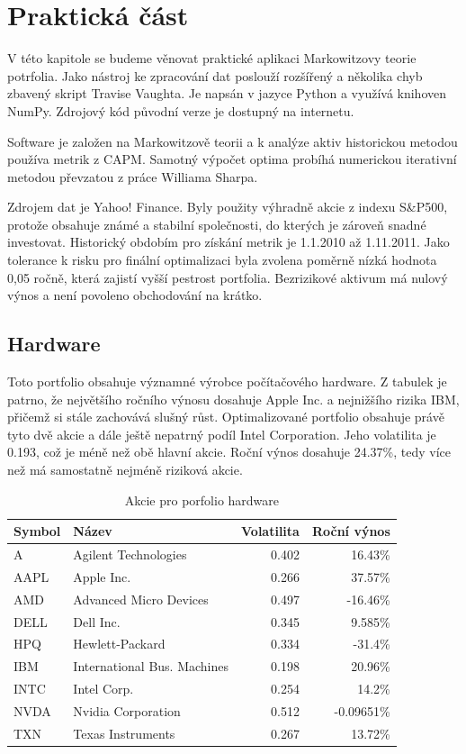 \documentclass[a4paper,12pt]{report}
\begin{document}
\chapter{Praktická část}
  V této kapitole se budeme věnovat praktické aplikaci Markowitzovy teorie potrfolia. Jako nástroj ke zpracování dat poslouží rozšířený a několika chyb zbavený skript Travise Vaughta\cite{tvaught}. Je napsán v jazyce Python a využívá knihoven NumPy. Zdrojový kód původní verze je dostupný na internetu\cite{source}.
  
  Software je založen na Markowitzově teorii a k analýze aktiv historickou metodou používa metrik z CAPM. Samotný výpočet optima probíhá numerickou iterativní metodou převzatou z práce Williama Sharpa\cite{sharpe}.
  
  Zdrojem dat je Yahoo! Finance\cite{yahoo}. Byly použity výhradně akcie z indexu S\&P500, protože obsahuje známé a stabilní společnosti, do kterých je zároveň snadné investovat. Historický obdobím pro získání metrik je 1.1.2010 až 1.11.2011. Jako tolerance k risku pro finální optimalizaci byla zvolena poměrně nízká hodnota 0,05 ročně, která zajistí vyšší pestrost portfolia. Bezrizikové aktivum má nulový výnos a není povoleno obchodování na krátko.
  \section{Hardware}
    Toto portfolio obsahuje významné výrobce počítačového hardware. Z tabulek je patrno, že největšího ročního výnosu dosahuje Apple Inc. a nejnižšího rizika IBM, přičemž si stále zachovává slušný růst. Optimalizované portfolio obsahuje právě tyto dvě akcie a dále ještě nepatrný podíl Intel Corporation. Jeho volatilita je 0.193, což je méně než obě hlavní akcie. Roční výnos dosahuje 24.37\%, tedy více než má samostatně nejméně riziková akcie.
    \begin{table}[htb]
      \centering
      \begin{tabular}{|l|l|r|r|}
        \hline
        Symbol&Název&Volatilita&Roční výnos\\\hline\hline
        A&Agilent Technologies &0.402&16.43\%\\\hline
        AAPL&Apple Inc. &0.266&37.57\%\\\hline
        AMD&Advanced Micro Devices &0.497&-16.46\%\\\hline
        DELL&Dell Inc. &0.345&9.585\%\\\hline
        HPQ&Hewlett-Packard &0.334&-31.4\%\\\hline
        IBM&International Bus. Machines &0.198&20.96\%\\\hline
        INTC&Intel Corp. &0.254&14.2\%\\\hline
        NVDA&Nvidia Corporation &0.512&-0.09651\%\\\hline
        TXN&Texas Instruments &0.267&13.72\%\\\hline
      \end{tabular}
      \caption{Akcie pro porfolio hardware}
    \end{table}
\end{document}
